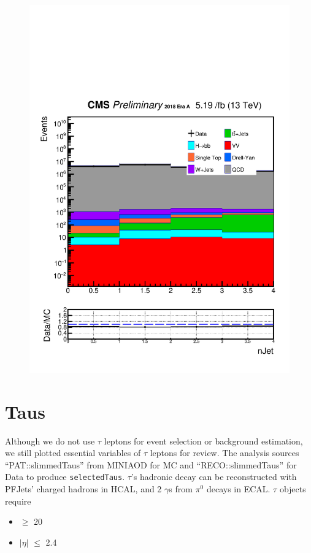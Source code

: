 \begin{figure}[h!]
  \includegraphics[width=0.47\linewidth]{figs/Data_log_AnalysisNote_MS-15_ctauS-10_nJet.pdf}
\end{figure}

\section{Taus}\label{sec:taus}
Although we do not use $\tau$ leptons for event selection or background estimation, we still plotted essential variables of $\tau$ leptons for review.
The analysis sources ``PAT::slimmedTaus'' from MINIAOD for MC and ``RECO::slimmedTaus'' for Data to produce {\tt selectedTaus}.
$\tau$'s hadronic decay can be reconstructed with PFJets' charged hadrons in HCAL, and 2 $\gamma$s from $\pi^{0}$ decays in ECAL.
$\tau$ objects require
\begin{itemize}
  \item \pt$\geq$ 20\GeV
  \item $|\eta|$ $\leq$ 2.4
\end{itemize}

